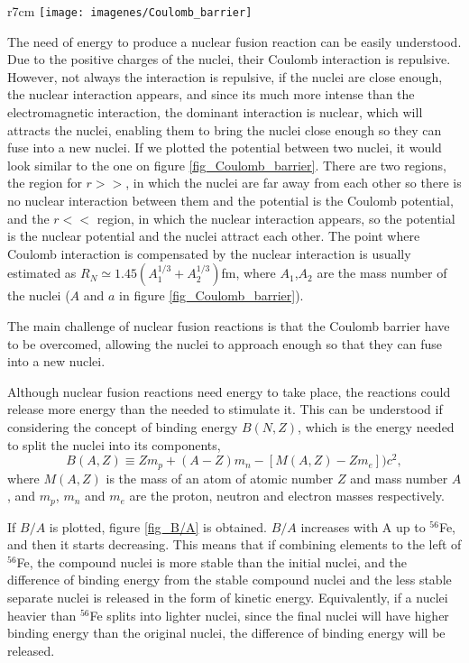 \documentclass[a4paper,12pt,oneside]{book}
\begin{document}
%
\begin{wrapfigure}{r}{7cm}
\centering
\texttt{[image: imagenes/Coulomb\_barrier]}
\caption{Coulomb barrier between two nuclei of mass number $A$ and $a$. $e=e/(4 \pi \varepsilon_0)$. Source: \cite{Satchler}.}
\label{fig_Coulomb_barrier}
\end{wrapfigure} 
%
The need of energy to produce a nuclear fusion reaction can be easily understood. Due to the positive charges of the nuclei, their Coulomb interaction is repulsive. However, not always the interaction is repulsive, if the nuclei are close enough, the nuclear interaction appears, and since its much more intense than the electromagnetic interaction, the dominant interaction is nuclear, which will attracts the nuclei, enabling them to bring the nuclei close enough so they can fuse into a new nuclei. If we plotted the potential between two nuclei, it would look similar to the one on figure \ref{fig_Coulomb_barrier}. There are two regions, the region for $r>>$, in which the nuclei are far away from each other so there is no nuclear interaction between them and the potential is the Coulomb potential, and the $r<<$ region, in which the nuclear interaction appears, so the potential is the nuclear potential and the nuclei attract each other. The point where Coulomb interaction is compensated by the nuclear interaction is usually estimated as $R_N \simeq 1.45 (A_1^{1/3}+A_2^{1/3})$fm, where $A_1$,$A_2$ are the mass number of the nuclei ($A$ and $a$ in figure \ref{fig_Coulomb_barrier}).

The main challenge of nuclear fusion reactions is that the Coulomb barrier have to be overcomed, allowing the nuclei to approach enough so that they can fuse into a new nuclei.

Although nuclear fusion reactions need energy to take place, the reactions could release more energy than the needed to stimulate it. This can be understood if considering the concept of binding energy $B(N,Z)$, which is the energy needed to split the nuclei into its components, 
%
\begin{equation}
B(A,Z) \equiv Zm_p+(A-Z)m_n-[M(A,Z)-Zm_e])c^2,
\end{equation} 
where $M(A,Z)$ is the mass of an atom of atomic number $Z$ and mass number $A$, and $m_p$, $m_n$ and $m_e$ are the proton, neutron and electron masses respectively. 

If $B/A$ is plotted, figure \ref{fig_B/A}  is obtained. $B/A$ increases with A up to $^{56}$Fe, and then it starts decreasing. This means that if combining elements to the left of $^{56}$Fe, the compound nuclei is more stable than the initial nuclei, and the difference of binding energy from the stable compound nuclei and the less stable separate nuclei is released in the form of kinetic energy. Equivalently, if a nuclei heavier than $^{56}$Fe splits into lighter nuclei, since the final nuclei will have higher binding energy than the original nuclei, the difference of binding energy will be released.
\end{document}

